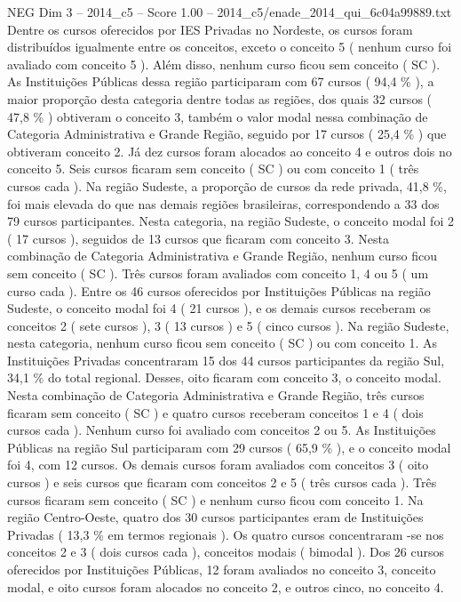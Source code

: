 \begin{textsample}{NEG Dim 3 – 2014\_c5 – Score 1.00 – 2014\_c5/enade\_2014\_qui\_6c04a99889.txt}
Dentre os cursos oferecidos por IES Privadas no Nordeste, os cursos foram distribuídos igualmente entre os conceitos, exceto o conceito 5 ( nenhum curso foi avaliado com conceito 5 ).
Além disso, nenhum curso ficou sem conceito ( SC ).
As Instituições Públicas dessa região participaram com 67 cursos ( 94,4 \% ), a maior proporção desta categoria dentre todas as regiões, dos quais 32 cursos ( 47,8 \% ) obtiveram o conceito 3, também o valor modal nessa combinação de Categoria Administrativa e Grande Região, seguido por 17 cursos ( 25,4 \% ) que obtiveram conceito 2.
Já dez cursos foram alocados ao conceito 4 e outros dois no conceito 5.
Seis cursos ficaram sem conceito ( SC ) ou com conceito 1 ( três cursos cada ).
Na região Sudeste, a proporção de cursos da rede privada, 41,8 \%, foi mais elevada do que nas demais regiões brasileiras, correspondendo a 33 dos 79 cursos participantes.
Nesta categoria, na região Sudeste, o conceito modal foi 2 ( 17 cursos ), seguidos de 13 cursos que ficaram com conceito 3.
Nesta combinação de Categoria Administrativa e Grande Região, nenhum curso ficou sem conceito ( SC ).
Três cursos foram avaliados com conceito 1, 4 ou 5 ( um curso cada ).
Entre os 46 cursos oferecidos por Instituições Públicas na região Sudeste, o conceito modal foi 4 ( 21 cursos ), e os demais cursos receberam os conceitos 2 ( sete cursos ), 3 ( 13 cursos ) e 5 ( cinco cursos ).
Na região Sudeste, nesta categoria, nenhum curso ficou sem conceito ( SC ) ou com conceito 1.
As Instituições Privadas concentraram 15 dos 44 cursos participantes da região Sul, 34,1 \% do total regional.
Desses, oito ficaram com conceito 3, o conceito modal.
Nesta combinação de Categoria Administrativa e Grande Região, três cursos ficaram sem conceito ( SC ) e quatro cursos receberam conceitos 1 e 4 ( dois cursos cada ).
Nenhum curso foi avaliado com conceitos 2 ou 5.
As Instituições Públicas na região Sul participaram com 29 cursos ( 65,9 \% ), e o conceito modal foi 4, com 12 cursos.
Os demais cursos foram avaliados com conceitos 3 ( oito cursos ) e seis cursos que ficaram com conceitos 2 e 5 ( três cursos cada ).
Três cursos ficaram sem conceito ( SC ) e nenhum curso ficou com conceito 1.
Na região Centro-Oeste, quatro dos 30 cursos participantes eram de Instituições Privadas ( 13,3 \% em termos regionais ).
Os quatro cursos concentraram -se nos conceitos 2 e 3 ( dois cursos cada ), conceitos modais ( bimodal ).
Dos 26 cursos oferecidos por Instituições Públicas, 12 foram avaliados no conceito 3, conceito modal, e oito cursos foram alocados no conceito 2, e outros cinco, no conceito 4.

\end{textsample}

